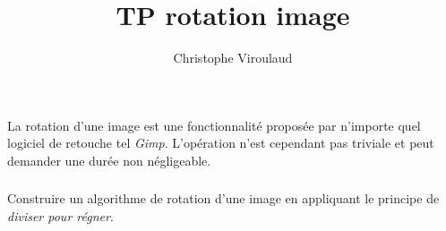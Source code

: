 \documentclass[svgnames,11pt]{beamer}
\author[]{Christophe Viroulaud}
\title{TP rotation image}
\date{\framebox{\textbf{Algo 03}}}
\institute{Terminale - NSI}
\begin{document}
\begin{frame}
    \titlepage
\end{frame}
\begin{frame}
    \frametitle{}

    La rotation d'une image est une fonctionnalité proposée par n'importe quel logiciel de retouche tel \emph{Gimp}. L'opération n'est cependant pas triviale et peut demander une durée non négligeable.

\end{frame}
\begin{frame}
    \frametitle{}

    \begin{framed}\centering
        Construire un algorithme de rotation d'une image en appliquant le principe de \emph{diviser pour régner}.
    \end{framed}

\end{frame}
\end{document}

